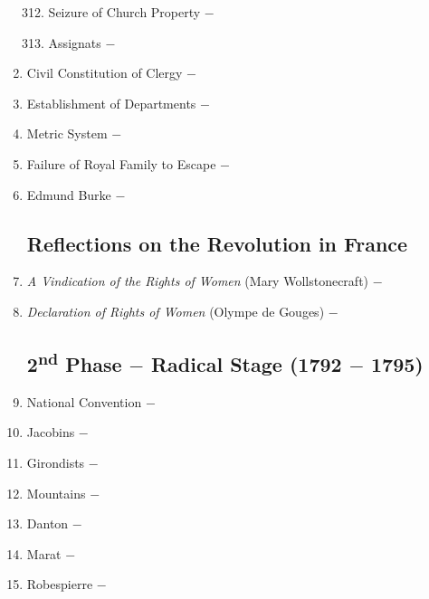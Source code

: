 \documentclass[12pt]{article}
\begin{document}
\begin{enumerate}
\begin{enumerate}[label=\arabic{*}.]
\setcounter{enumii}{311}

\item Seizure of Church Property $-$

\item Assignats $-$ 

\end{enumerate}
\setcounter{enumi}{313}

\item Civil Constitution of Clergy $-$ 

\item Establishment of Departments $-$ 

\item Metric System $-$ 

\item Failure of Royal Family to Escape $-$ 

\item Edmund Burke $-$

\subsection{Reflections on the Revolution in France}

\item \textit{A Vindication of the Rights of Women} (Mary Wollstonecraft) $-$

\item \textit{Declaration of Rights of Women} (Olympe de Gouges) $-$

\subsection{2\textsuperscript{nd} Phase $-$ Radical Stage (1792 $-$ 1795)}

\item National Convention $-$ 

\item Jacobins $-$ 

\item Girondists $-$ 

\item Mountains $-$ 

\item Danton $-$ 

\item Marat $-$ 

\item Robespierre $-$ 


\end{enumerate}
\end{document}
